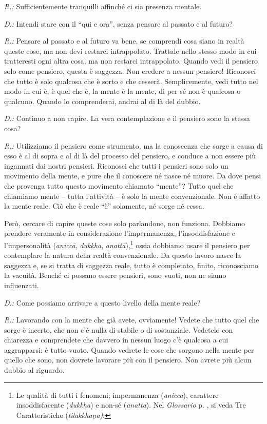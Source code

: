 \emph{R.:} Sufficientemente tranquilli affinché ci sia presenza mentale.

\emph{D.:} Intendi stare con il ``qui e ora'', senza pensare al passato e al
futuro?

\emph{R.:} Pensare al passato e al futuro va bene, se comprendi cosa siano in
realtà queste cose, ma non devi restarci intrappolato. Trattale nello
stesso modo in cui tratteresti ogni altra cosa, ma non restarci
intrappolato. Quando vedi il pensiero solo come pensiero, questa è
saggezza. Non credere a nessun pensiero! Riconosci che tutto è solo
qualcosa che è sorto e che cesserà. Semplicemente, vedi tutto nel modo
in cui è, è quel che è, la mente è la mente, di per sé non è qualcosa o
qualcuno. Quando lo comprenderai, andrai al di là del dubbio.

\emph{D.:} Continuo a non capire. La vera contemplazione e il pensiero sono la
stessa cosa?

\emph{R.:} Utilizziamo il pensiero come strumento, ma la conoscenza che sorge a
causa di esso è al di sopra e al di là del processo del pensiero, e
conduce a non essere più ingannati dai nostri pensieri. Riconosci che
tutti i pensieri sono solo un movimento della mente, e pure che il
conoscere né nasce né muore. Da dove pensi che provenga tutto questo
movimento chiamato ``mente''? Tutto quel che chiamiamo mente -- tutta
l'attività -- è solo la mente convenzionale. Non è affatto la mente
reale. Ciò che è reale ``è'' solamente, né sorge né cessa.

Però, cercare di capire queste cose solo parlandone, non funziona.
Dobbiamo prendere veramente in considerazione l'impermanenza,
l'insoddisfazione e l'impersonalità (\emph{aniccā}, \emph{dukkha},
\emph{anattā}),\footnote{Le qualità di tutti i fenomeni; impermanenza
  (\emph{anicca}), carattere insoddisfacente (\emph{dukkha}) e non-sé
  (\emph{anatta}). Nel \emph{Glossario} p. \pageref{glossary-tilakkhana}, si veda Tre Caratteristiche
  (\emph{tilakkhaṇa)}.} ossia dobbiamo usare il pensiero per contemplare
la natura della realtà convenzionale. Da questo lavoro nasce la saggezza
e, se si tratta di saggezza reale, tutto è completato, finito,
riconosciamo la vacuità. Benché ci possano essere pensieri, sono vuoti,
non ne siamo influenzati.

\emph{D.:} Come possiamo arrivare a questo livello della mente reale?

\emph{R.:} Lavorando con la mente che già avete, ovviamente! Vedete che tutto
quel che sorge è incerto, che non c'è nulla di stabile o di sostanziale.
Vedetelo con chiarezza e comprendete che davvero in nessun luogo c'è
qualcosa a cui aggrapparsi: è tutto vuoto. Quando vedrete le cose che
sorgono nella mente per quello che sono, non dovrete lavorare più con il
pensiero. Non avrete più alcun dubbio al riguardo.

